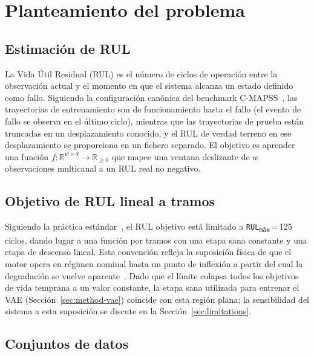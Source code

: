 \documentclass[5p,times,authoryear]{elsarticle}
\begin{document}
\section{Planteamiento del problema}\label{sec:problem}

\subsection{Estimación de RUL}\label{sec:problem-rul}

La Vida Útil Residual (RUL) es el número de ciclos de operación entre la observación actual y el momento en que el sistema alcanza un estado definido como fallo. Siguiendo la configuración canónica del benchmark C-MAPSS~\citep{saxena2008damage}, las trayectorias de entrenamiento son de funcionamiento hasta el fallo (el evento de fallo se observa en el último ciclo), mientras que las trayectorias de prueba están truncadas en un desplazamiento conocido, y el RUL de verdad terreno en ese desplazamiento se proporciona en un fichero separado. El objetivo es aprender una función $f: \mathbb{R}^{w\times d}\to\mathbb{R}_{\ge 0}$ que mapee una ventana deslizante de $w$ observaciones multicanal a un RUL real no negativo.

\subsection{Objetivo de RUL lineal a tramos}\label{sec:problem-target}

Siguiendo la práctica estándar~\citep{heimes2008recurrent,li2018remaining}, el RUL objetivo está limitado a \texttt{RUL\textsubscript{máx}}\,=\,125\,ciclos, dando lugar a una función por tramos con una etapa sana constante y una etapa de descenso lineal. Esta convención refleja la suposición física de que el motor opera en régimen nominal hasta un punto de inflexión a partir del cual la degradación se vuelve aparente~\citep{costa2022rve}. Dado que el límite colapsa todos los objetivos de vida temprana a un valor constante, la etapa sana utilizada para entrenar el VAE (Sección~\ref{sec:method-vae}) coincide con esta región plana; la sensibilidad del sistema a esta suposición se discute en la Sección~\ref{sec:limitations}.

\subsection{Conjuntos de datos}\label{sec:problem-data}
\end{document}
